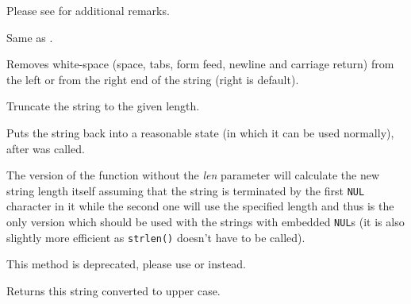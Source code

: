 Please see  for additional remarks.


\label{wxstringtoutf8}



Same as .


\label{wxstringtrim}


Removes white-space (space, tabs, form feed, newline and carriage return) from
the left or from the right end of the string (right is default).


\label{wxstringtruncate}


Truncate the string to the given length.


\label{wxstringungetwritebuf}



Puts the string back into a reasonable state (in which it can be used
normally), after
\rtfsp{} was called.

The version of the function without the {\it len} parameter will calculate the
new string length itself assuming that the string is terminated by the first
{\tt NUL} character in it while the second one will use the specified length
and thus is the only version which should be used with the strings with
embedded {\tt NUL}s (it is also slightly more efficient as {\tt strlen()} 
doesn't have to be called).

This method is deprecated, please use
 or
 instead.


\label{wxstringupper}


Returns this string converted to upper case.


\label{wxstringuppercase}


